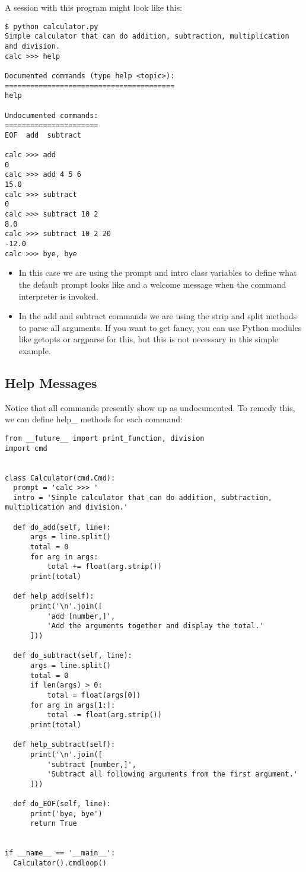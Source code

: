 A session with this program might look like this:

\begin{lstlisting}
$ python calculator.py
Simple calculator that can do addition, subtraction, multiplication and division.
calc >>> help

Documented commands (type help <topic>):
========================================
help

Undocumented commands:
======================
EOF  add  subtract

calc >>> add
0
calc >>> add 4 5 6
15.0
calc >>> subtract
0
calc >>> subtract 10 2
8.0
calc >>> subtract 10 2 20
-12.0
calc >>> bye, bye
\end{lstlisting}

\begin{itemize}
\tightlist
\item
  In this case we are using the prompt and intro class variables to
  define what the default prompt looks like and a welcome message when
  the command interpreter is invoked.
\item
  In the add and subtract commands we are using the strip and split
  methods to parse all arguments. If you want to get fancy, you can use
  Python modules like getopts or argparse for this, but this is not
  necessary in this simple example.
\end{itemize}

\subsection{Help Messages}\label{help-messages}

Notice that all commands presently show up as undocumented. To remedy
this, we can define help\_ methods for each command:

\begin{lstlisting}
from __future__ import print_function, division
import cmd


class Calculator(cmd.Cmd):
  prompt = 'calc >>> '
  intro = 'Simple calculator that can do addition, subtraction, multiplication and division.'

  def do_add(self, line):
      args = line.split()
      total = 0
      for arg in args:
          total += float(arg.strip())
      print(total)

  def help_add(self):
      print('\n'.join([
          'add [number,]',
          'Add the arguments together and display the total.'
      ]))

  def do_subtract(self, line):
      args = line.split()
      total = 0
      if len(args) > 0:
          total = float(args[0])
      for arg in args[1:]:
          total -= float(arg.strip())
      print(total)

  def help_subtract(self):
      print('\n'.join([
          'subtract [number,]',
          'Subtract all following arguments from the first argument.'
      ]))

  def do_EOF(self, line):
      print('bye, bye')
      return True


if __name__ == '__main__':
  Calculator().cmdloop()
\end{lstlisting}

